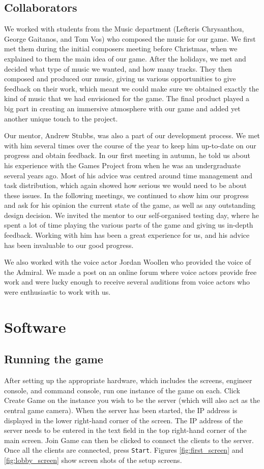 \documentclass[a4paper,11pt]{article}
\begin{document}
\subsection{Collaborators}
We worked with students from the Music department (Lefteris Chrysanthou, George Gaitanos, and Tom Vos) who composed the music for our game. We first met them during the initial composers meeting before Christmas, when we explained to them the main idea of our game. After the holidays, we met and decided what type of music we wanted, and how many tracks. They then composed and produced our music, giving us various opportunities to give feedback on their work, which meant we could make sure we obtained exactly the kind of music that we had envisioned for the game. The final product played a big part in creating an immersive atmosphere with our game and added yet another unique touch to the project.

Our mentor, Andrew Stubbs, was also a part of our development process. We met with him several times over the course of the year to keep him up-to-date on our progress and obtain feedback. In our first meeting in autumn, he told us about his experience with the Games Project from when he was an undergraduate several years ago. Most of his advice was centred around time management and task distribution, which again showed how serious we would need to be about these issues. In the following meetings, we continued to show him our progress and ask for his opinion the current state of the game, as well as any outstanding design decision. We invited the mentor to our self-organised testing day, where he spent a lot of time playing the various parts of the game and giving us in-depth feedback. Working with him has been a great experience for us, and his advice has been invaluable to our good progress.

We also worked with the voice actor Jordan Woollen who provided the voice of the Admiral. We made a post on an online forum where voice actors provide free work and were lucky enough to receive several auditions from voice actors who were enthusiastic to work with us.

\section{Software}

\subsection{Running the game}
After setting up the appropriate hardware, which includes the screens, engineer console, and command console, run one instance of the game on each. Click Create Game on the instance you wish to be the server (which will also act as the central game camera). When the server has been started, the IP address is displayed in the lower right-hand corner of the screen. The IP address of the server needs to be entered in the text field in the top right-hand corner of the main screen. Join Game can then be clicked to connect the clients to the server. Once all the clients are connected, press \texttt{Start}. Figures \ref{fig:first_screen} and \ref{fig:lobby_screen} show screen shots of the setup screens.
\end{document}
